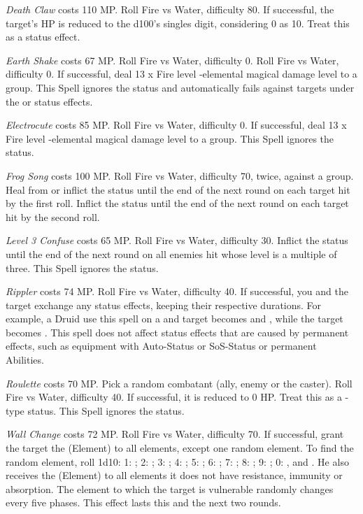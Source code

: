 \begin{multicols}{2}
    \textit{Death Claw} costs 110 MP\@. Roll Fire vs Water, difficulty 80. If successful, the target's HP is reduced to the d100’s singles digit, considering 0 as 10. Treat this as a  status effect.
    
    \textit{Earth Shake} costs 67 MP\@. Roll Fire vs Water, difficulty 0. Roll Fire vs Water, difficulty 0. If successful, deal 13 x Fire level -elemental magical damage level to a group. This Spell ignores the  status and automatically fails against targets under the  or  status effects.
    
    \textit{Electrocute} costs 85 MP\@. Roll Fire vs Water, difficulty 0. If successful, deal 13 x Fire level -elemental magical damage level to a group. This Spell ignores the  status.
    
    \textit{Frog Song} costs 100 MP\@. Roll Fire vs Water, difficulty 70, twice, against a group. Heal from or inflict the  status until the end of the next round on each target hit by the first roll. Inflict the  status until the end of the next round on each target hit by the second roll.
    
    \textit{Level 3 Confuse} costs 65 MP\@. Roll Fire vs Water, difficulty 30. Inflict the  status until the end of the next round on all enemies hit whose level is a multiple of three. This Spell ignores the  status.
    
    \textit{Rippler} costs 74 MP\@. Roll Fire vs Water, difficulty 40. If successful, you and the target exchange any status effects, keeping their respective durations. For example, a  Druid use this spell on a  and  target becomes  and , while the target becomes . This spell does not affect status effects that are caused by permanent effects, such as equipment with Auto-Status or SoS-Status or permanent Abilities.
    
    \textit{Roulette} costs 70 MP\@. Pick a random combatant (ally, enemy or the caster). Roll Fire vs Water, difficulty 40. If successful, it is reduced to 0 HP\@. Treat this as a -type status. This Spell ignores the  status.
    
	\textit{Wall Change} costs 72 MP\@. Roll Fire vs Water, difficulty 70. If successful, grant the target the (Element)  to all elements, except one random element. To find the random element, roll 1d10: 1: ; 2: ; 3: ; 4: ; 5: ; 6: ; 7: ; 8: ; 9: ; 0: ,  and . He also receives the (Element)  to all elements it does not have resistance, immunity or absorption. The element to which the target is vulnerable randomly changes every five phases. This effect lasts this and the next two rounds.
    

\end{multicols}

